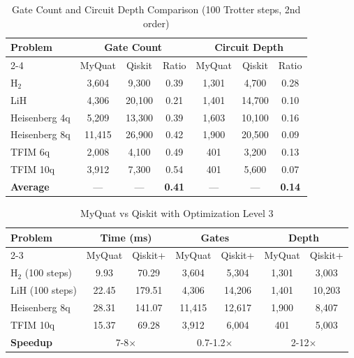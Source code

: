 \begin{table}[h]
\centering
\caption{Gate Count and Circuit Depth Comparison (100 Trotter steps, 2nd order)}
\label{tab:gate_depth}
\begin{tabular}{lcccccc}
\hline
\textbf{Problem} & \multicolumn{3}{c}{\textbf{Gate Count}} & \multicolumn{3}{c}{\textbf{Circuit Depth}} \\
\cline{2-4} \cline{5-7}
 & MyQuat & Qiskit & Ratio & MyQuat & Qiskit & Ratio \\
\hline
H$_2$ & 3,604 & 9,300 & 0.39 & 1,301 & 4,700 & 0.28 \\
LiH & 4,306 & 20,100 & 0.21 & 1,401 & 14,700 & 0.10 \\
Heisenberg 4q & 5,209 & 13,300 & 0.39 & 1,603 & 10,100 & 0.16 \\
Heisenberg 8q & 11,415 & 26,900 & 0.42 & 1,900 & 20,500 & 0.09 \\
TFIM 6q & 2,008 & 4,100 & 0.49 & 401 & 3,200 & 0.13 \\
TFIM 10q & 3,912 & 7,300 & 0.54 & 401 & 5,600 & 0.07 \\
\hline
\textbf{Average} & --- & --- & \textbf{0.41} & --- & --- & \textbf{0.14} \\
\hline
\end{tabular}
\end{table}

\begin{table}[h]
\centering
\caption{MyQuat vs Qiskit with Optimization Level 3}
\label{tab:qiskit_optimized}
\begin{tabular}{lcccccc}
\hline
\textbf{Problem} & \multicolumn{2}{c}{\textbf{Time (ms)}} & \multicolumn{2}{c}{\textbf{Gates}} & \multicolumn{2}{c}{\textbf{Depth}} \\
\cline{2-3} \cline{4-5} \cline{6-7}
 & MyQuat & Qiskit+ & MyQuat & Qiskit+ & MyQuat & Qiskit+ \\
\hline
H$_2$ (100 steps) & 9.93 & 70.29 & 3,604 & 5,304 & 1,301 & 3,003 \\
LiH (100 steps) & 22.45 & 179.51 & 4,306 & 14,206 & 1,401 & 10,203 \\
Heisenberg 8q & 28.31 & 141.07 & 11,415 & 12,617 & 1,900 & 8,407 \\
TFIM 10q & 15.37 & 69.28 & 3,912 & 6,004 & 401 & 5,003 \\
\hline
\textbf{Speedup} & \multicolumn{2}{c}{7-8$\times$} & \multicolumn{2}{c}{0.7-1.2$\times$} & \multicolumn{2}{c}{2-12$\times$} \\
\hline
\end{tabular}
\end{table}

